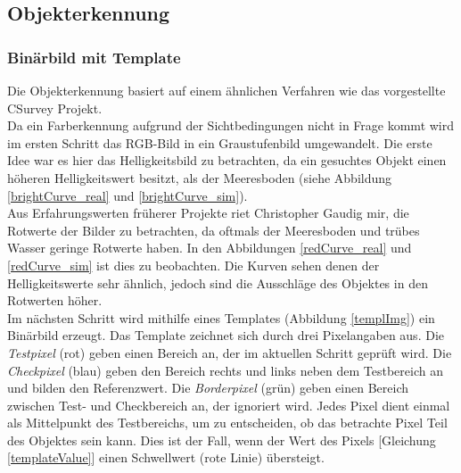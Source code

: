 \subsection{Objekterkennung}
\label{sec_objDet}
\subsubsection{Binärbild mit Template}
Die Objekterkennung basiert auf einem ähnlichen Verfahren wie das vorgestellte CSurvey Projekt\cite{Albiez2015CSurveyA}.\\
Da ein Farberkennung aufgrund der Sichtbedingungen nicht in Frage kommt wird im ersten Schritt das RGB-Bild in ein Graustufenbild umgewandelt. Die erste Idee war es hier das Helligkeitsbild zu betrachten, da ein gesuchtes Objekt einen höheren Helligkeitswert besitzt, als der Meeresboden (siehe Abbildung \ref{brightCurve_real} und \ref{brightCurve_sim}).\\
Aus Erfahrungswerten früherer Projekte riet Christopher Gaudig mir, die Rotwerte der Bilder zu betrachten, da oftmals der Meeresboden und trübes Wasser geringe Rotwerte haben. In den Abbildungen \ref{redCurve_real} und \ref{redCurve_sim} ist dies zu beobachten. Die Kurven sehen denen der Helligkeitswerte sehr ähnlich, jedoch sind die Ausschläge des Objektes in den Rotwerten höher.\\
Im nächsten Schritt wird mithilfe eines Templates (Abbildung \ref{templImg}) ein Binärbild erzeugt. Das Template zeichnet sich durch drei Pixelangaben aus. Die \textit{Testpixel} (rot) geben einen Bereich an, der im aktuellen Schritt geprüft wird. Die \textit{Checkpixel} (blau) geben den Bereich rechts und links neben dem Testbereich an und bilden den Referenzwert. Die \textit{Borderpixel} (grün) geben einen Bereich zwischen Test- und Checkbereich an, der ignoriert wird. Jedes Pixel dient einmal als Mittelpunkt des Testbereichs, um zu entscheiden, ob das betrachte Pixel Teil des Objektes sein kann. Dies ist der Fall, wenn der Wert des Pixels [Gleichung \ref{templateValue}] einen Schwellwert (rote Linie) übersteigt.\\
